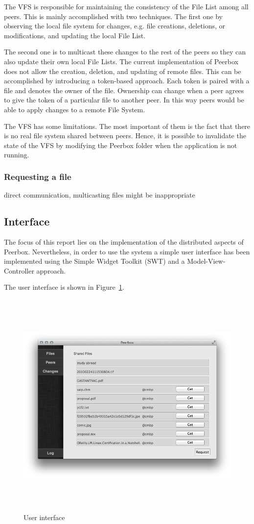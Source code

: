 The VFS is responsible for maintaining the consistency of the File List among all peers. This is mainly accomplished with two techniques. The first one by observing the local file system for changes, e.g. file creations, deletions, or modifications, and updating the local File List.

The second one is to multicast these changes to the rest of the peers so they can also update their own local File Lists. The current implementation of Peerbox does not allow the creation, deletion, and updating of remote files. This can be accomplished by introducing a token-based approach. Each token is paired with a file and denotes the owner of the file. Ownership can change when a peer agrees to give the token of a particular file to another peer. In this way peers would be able to apply changes to a remote File System.

The VFS has some limitations. The most important of them is the fact that there is no real file system shared between peers. Hence, it is possible to invalidate the state of the VFS by modifying the Peerbox folder when the application is not running.


\subsubsection{Requesting a file}
direct communication, multicasting files might be inappropriate


\subsection{Interface}
The focus of this report lies on the implementation of the distributed aspects of Peerbox. Nevertheless, in order to use the system a simple user interface has been implemented using the Simple Widget Toolkit (SWT) and a Model-View-Controller approach. 

The user interface is shown in Figure~\ref{fig:figures_gui}.
\begin{figure}[htbp]
    \centering
        \includegraphics[height=4.5in]{figures/gui.png}
    \caption{User interface}
    \label{fig:figures_gui}
\end{figure}
